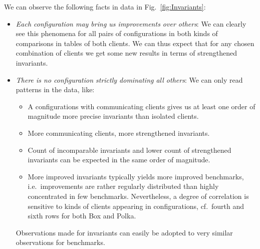 \documentclass[envcountsame]{llncs}
\begin{document}
\noindent
We can observe the following facts in data in Fig.~\ref{fig:Invariants}:
\begin{itemize}
\item \emph{Each configuration may bring us improvements over others}: We can
clearly see this phenomena for all pairs of configurations in both kinds of
comparisons in tables of both clients. We can thus expect that for any chosen
combination of clients we get some new results in terms of strengthened
invariants. \item \emph{There is no configuration strictly dominating all others}: We can
only read patterns in the data, like:
\begin{itemize}
\item A configurations with communicating clients gives us at least one order of
magnitude more precise invariants than isolated clients. \item More communicating clients, more strengthened invariants. \item Count of incomparable invariants and lower count of strengthened
invariants can be expected in the same order of magnitude. \item More improved invariants typically yields more improved benchmarks,
i.e.~improvements are rather regularly distributed than highly concentrated in
few benchmarks. Nevertheless, a degree of correlation is sensitive to kinds of
clients appearing in configurations, cf.~fourth and sixth rows for both Box and
Polka. \end{itemize}
Observations made for invariants can easily be adopted to very similar
observations for benchmarks.
\end{itemize}
\end{document}
